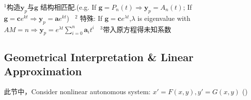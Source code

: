 \documentclass[8pt]{extarticle}
\begin{document}
$^1${\scriptsize 构造$\mathbf{y}_p$与$\mathbf{g}$ 结构相匹配.(e.g. If $\mathbf{g}=P_n(t)\Rightarrow \mathbf{y}_p=A_n(t)$; If $\mathbf{g}=\mathbf{c}e^{kt}\Rightarrow \mathbf{y}_p=\mathbf{a}e^{kt}$)} \ $^2$ {\scriptsize 特殊: If $\mathbf{g}=\mathbf{c}e^{\lambda t}$,$\lambda$ is eigenvalue with $AM=n\Rightarrow \mathbf{y}_p=e^{\lambda t}\sum_{i=0}^{n}\mathbf{a}_it^i$} \ $^3${\scriptsize 带入原方程得未知系数}


\subsection{Geometrical Interpretation \& Linear Approximation}

\vspace{-2pt}
{\tiny * 此节中，Consider nonlinear autonomous system: $x'=F(x,y),y'=G(x,y)$ (\ast\ast)}
\vspace{-2pt}
\end{document}

